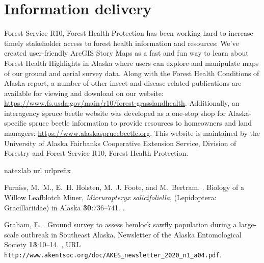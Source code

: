 \section{Information delivery}

 Forest Service R10, Forest Health Protection has been working hard to increase timely stakeholder access to forest health information and resources: We’ve created user-friendly  ArcGIS Story Maps as a fast and fun way to learn about Forest Health Highlights in Alaska where users can explore and manipulate maps of our ground and aerial survey data. Along with the Forest Health Conditions of Alaska report, a number of other insect and disease related publications are available for viewing and download on our website: \url{https://www.fs.usda.gov/main/r10/forest-grasslandhealth}. Additionally, an interagency spruce beetle website was developed as a one-stop shop for Alaska-specific spruce beetle information to provide resources to homeowners and land managers: \url{https://www.alaskasprucebeetle.org}. This website is maintained by the University of Alaska Fairbanks Cooperative Extension Service,  Division of Forestry and  Forest Service R10, Forest Health Protection.

%

\begin{thebibliography}{2}
\expandafter\ifx\csname natexlab\endcsname\relax\def\natexlab#1{#1}\fi
\expandafter\ifx\csname url\endcsname\relax
  \def\url#1{{\tt #1}}\fi
\expandafter\ifx\csname urlprefix\endcsname\relax\def\urlprefix{{\small URL}
  }\fi

Furniss, M.~M., E.~H. Holsten, M.~J. Foote, and M.~Bertram.
.
\newblock Biology of a Willow Leafblotch Miner, \textit{Micrurapteryx
  salicifoliella}, (Lepidoptera: Gracillariidae) in Alaska {\bfseries
  30}:736--741.
\newblock {}.

Graham, E.
.
\newblock Ground survey to assess hemlock sawfly population during a
  large-scale outbreak in Southeast Alaska.
\newblock Newsletter of the Alaska Entomological Society {\bfseries 13}:10--14.
\newblock {}, \urlprefix\url{http://www.akentsoc.org/doc/AKES_newsletter_2020_n1_a04.pdf}.

\end{thebibliography}


